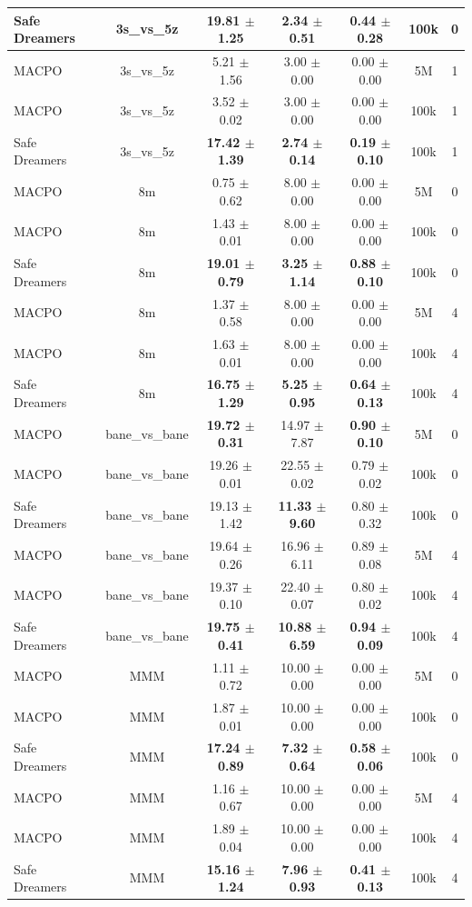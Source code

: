 \begin{longtable}{lcccccc}
Safe Dreamers & 3s\_vs\_5z & \textbf{19.81 $\pm$ 1.25} & \textbf{2.34 $\pm$ 0.51} & \textbf{0.44 $\pm$ 0.28} & 100k & 0 \\
\midrule
MACPO & 3s\_vs\_5z & 5.21 $\pm$ 1.56 & 3.00 $\pm$ 0.00 & 0.00 $\pm$ 0.00 & 5M & 1 \\
MACPO & 3s\_vs\_5z & 3.52 $\pm$ 0.02 & 3.00 $\pm$ 0.00 & 0.00 $\pm$ 0.00 & 100k & 1 \\
Safe Dreamers & 3s\_vs\_5z & \textbf{17.42 $\pm$ 1.39} & \textbf{2.74 $\pm$ 0.14} & \textbf{0.19 $\pm$ 0.10} & 100k & 1 \\
\midrule
MACPO & 8m & 0.75 $\pm$ 0.62 & 8.00 $\pm$ 0.00 & 0.00 $\pm$ 0.00 & 5M & 0 \\
MACPO & 8m & 1.43 $\pm$ 0.01 & 8.00 $\pm$ 0.00 & 0.00 $\pm$ 0.00 & 100k & 0 \\
Safe Dreamers & 8m & \textbf{19.01 $\pm$ 0.79} & \textbf{3.25 $\pm$ 1.14} & \textbf{0.88 $\pm$ 0.10} & 100k & 0 \\
\midrule
MACPO & 8m & 1.37 $\pm$ 0.58 & 8.00 $\pm$ 0.00 & 0.00 $\pm$ 0.00 & 5M & 4 \\
MACPO & 8m & 1.63 $\pm$ 0.01 & 8.00 $\pm$ 0.00 & 0.00 $\pm$ 0.00 & 100k & 4 \\
Safe Dreamers & 8m & \textbf{16.75 $\pm$ 1.29} & \textbf{5.25 $\pm$ 0.95} & \textbf{0.64 $\pm$ 0.13} & 100k & 4 \\
\midrule
MACPO & bane\_vs\_bane & \textbf{19.72 $\pm$ 0.31} & 14.97 $\pm$ 7.87 & \textbf{0.90 $\pm$ 0.10} & 5M & 0 \\
MACPO & bane\_vs\_bane & 19.26 $\pm$ 0.01 & 22.55 $\pm$ 0.02 & 0.79 $\pm$ 0.02 & 100k & 0 \\
Safe Dreamers & bane\_vs\_bane & 19.13 $\pm$ 1.42 & \textbf{11.33 $\pm$ 9.60} & 0.80 $\pm$ 0.32 & 100k & 0 \\
\midrule
MACPO & bane\_vs\_bane & 19.64 $\pm$ 0.26 & 16.96 $\pm$ 6.11 & 0.89 $\pm$ 0.08 & 5M & 4 \\
MACPO & bane\_vs\_bane & 19.37 $\pm$ 0.10 & 22.40 $\pm$ 0.07 & 0.80 $\pm$ 0.02 & 100k & 4 \\
Safe Dreamers & bane\_vs\_bane & \textbf{19.75 $\pm$ 0.41} & \textbf{10.88 $\pm$ 6.59} & \textbf{0.94 $\pm$ 0.09} & 100k & 4 \\
\midrule
MACPO & MMM & 1.11 $\pm$ 0.72 & 10.00 $\pm$ 0.00 & 0.00 $\pm$ 0.00 & 5M & 0 \\
MACPO & MMM & 1.87 $\pm$ 0.01 & 10.00 $\pm$ 0.00 & 0.00 $\pm$ 0.00 & 100k & 0 \\
Safe Dreamers & MMM & \textbf{17.24 $\pm$ 0.89} & \textbf{7.32 $\pm$ 0.64} & \textbf{0.58 $\pm$ 0.06} & 100k & 0 \\
\midrule
MACPO & MMM & 1.16 $\pm$ 0.67 & 10.00 $\pm$ 0.00 & 0.00 $\pm$ 0.00 & 5M & 4 \\
MACPO & MMM & 1.89 $\pm$ 0.04 & 10.00 $\pm$ 0.00 & 0.00 $\pm$ 0.00 & 100k & 4 \\
Safe Dreamers & MMM & \textbf{15.16 $\pm$ 1.24} & \textbf{7.96 $\pm$ 0.93} & \textbf{0.41 $\pm$ 0.13} & 100k & 4 \\
\midrule
\end{longtable}